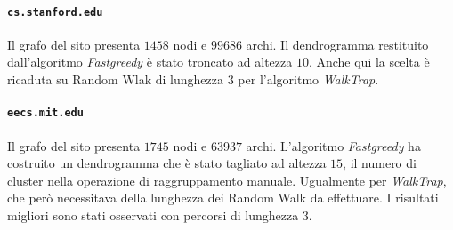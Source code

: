  
\paragraph{\texttt{cs.stanford.edu}} Il grafo del sito presenta $1458$ nodi e $99686$ archi. Il dendrogramma restituito dall'algoritmo \textit{Fastgreedy} è stato troncato ad altezza $10$. Anche qui la scelta è ricaduta su Random Wlak di lunghezza $3$ per l'algoritmo \textit{WalkTrap}.
 
\paragraph{\texttt{eecs.mit.edu}} Il grafo del sito presenta $1745$ nodi e $63937$ archi. L'algoritmo \textit{Fastgreedy} ha costruito un dendrogramma che è stato tagliato ad altezza $15$, il numero di cluster nella operazione di raggruppamento manuale. Ugualmente per \textit{WalkTrap}, che però necessitava della lunghezza dei Random Walk da effettuare. I risultati migliori sono stati osservati con percorsi di lunghezza $3$.

